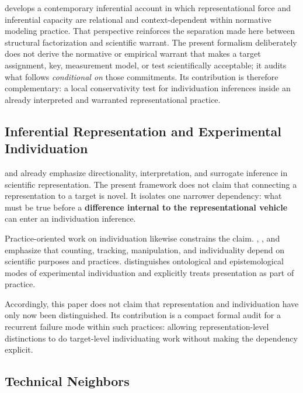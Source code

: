 \documentclass[12pt]{article}
\begin{document}
\citet{Suarez2024InferenceRepresentation} develops a contemporary inferential account in which representational force and inferential capacity are relational and context-dependent within normative modeling practice. That perspective reinforces the separation made here between structural factorization and scientific warrant. The present formalism deliberately does not derive the normative or empirical warrant that makes a target assignment, key, measurement model, or test scientifically acceptable; it audits what follows \emph{conditional on} those commitments. Its contribution is therefore complementary: a local conservativity test for individuation inferences inside an already interpreted and warranted representational practice.

\subsection{Inferential Representation and Experimental Individuation}

\citet{Suarez2004Inferential} and \citet{Contessa2007Surrogative} already emphasize directionality, interpretation, and surrogate inference in scientific representation. The present framework does not claim that connecting a representation to a target is novel. It isolates one narrower dependency: what must be true before a \textbf{difference internal to the representational vehicle} can enter an individuation inference.

Practice-oriented work on individuation likewise constrains the claim. \citet{BuenoChenFagan2018}, \citet{Waters2018AskNot}, and \citet{Love2018ExperimentalPractice} emphasize that counting, tracking, manipulation, and individuality depend on scientific purposes and practices. \citet{Chen2018ExperimentalIndividuation} distinguishes ontological and epistemological modes of experimental individuation and explicitly treats presentation as part of practice.

Accordingly, this paper does not claim that representation and individuation have only now been distinguished. Its contribution is a compact formal audit for a recurrent failure mode within such practices: allowing representation-level distinctions to do target-level individuating work without making the dependency explicit.

\subsection{Technical Neighbors}
\end{document}

